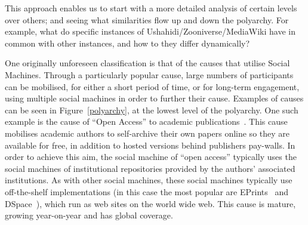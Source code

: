 \documentclass{sig-alternate}
\begin{document}
This approach enables us to start with a more detailed analysis of certain levels over others;
and seeing what similarities flow up and down the polyarchy. For example, what do
specific instances of Ushahidi/Zooniverse/MediaWiki have in common with other instances, and
how to they differ dynamically?

One originally unforeseen classification is that of the causes that utilise Social Machines.
Through a particularly popular cause, large numbers of participants can be mobilised, for
either a short period of time, or for long-term engagement, using multiple social machines
in order to further their cause. Examples of causes can be seen in Figure~\ref{polyarchy},
at the lowest level of the polyarchy. One such example is the cause of ``Open Access'' to
academic publications~\cite{harnad2001self}. This cause mobilises academic authors to
self-archive their own papers online so they are available for free, in addition to hosted
versions behind publishers pay-walls. In order to achieve this aim, the social machine of
``open access'' typically uses the social machines of institutional repositories provided
by the authors' associated institutions. As with other social machines, these social
machines typically use off-the-shelf implementations (in this case the most popular are
EPrints~\cite{eprints} and DSpace~\cite{dspace}), which run as web sites on the world wide
web. This cause is mature, growing year-on-year and has global coverage.
\end{document}
